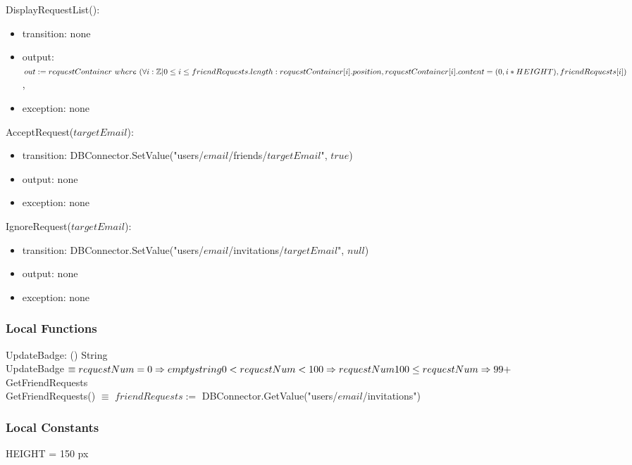\documentclass[12pt, titlepage]{article}
\begin{document}
\noindent DisplayRequestList():
\begin{itemize}
\item transition: none
\item output: $out := requestContainer\ where\ (\forall i : \mathbb{Z} | 0 \leq i \leq friendRequests.length:\\ requestContainer[i].position, requestContainer[i].content =\\(0, i*HEIGHT), friendRequests[i])$,
\item exception: none
\end{itemize}

\noindent AcceptRequest($targetEmail$):
\begin{itemize}
\item transition: DBConnector.SetValue("users/$email$/friends/$targetEmail$", $true$)
\item output: none
\item exception: none
\end{itemize}

\noindent IgnoreRequest($targetEmail$):
\begin{itemize}
\item transition: DBConnector.SetValue("users/$email$/invitations/$targetEmail$", $null$)
\item output: none
\item exception: none
\end{itemize}

\subsubsection{Local Functions}

\noindent UpdateBadge: () \textrightarrow \space String \\
UpdateBadge $\equiv requestNum = 0 \Rightarrow empty string \\ 0 < requestNum < 100 \Rightarrow requestNum\\ 100 \leq requestNum \Rightarrow 99+$\\

\noindent GetFriendRequests \\
GetFriendRequests() $\equiv$ $friendRequests :=$ DBConnector.GetValue("users/$email$/invitations")

\subsubsection{Local Constants}
HEIGHT = 150 px
\end{document}
